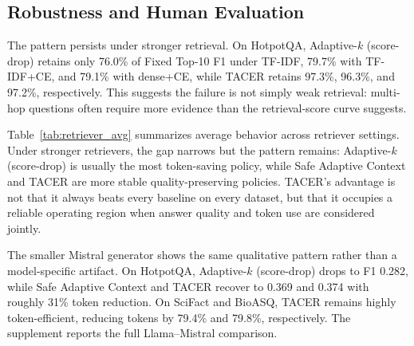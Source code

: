\documentclass[11pt]{article}
\begin{document}
\begin{table}[t]
\centering
\small
\caption{Paired TACER--Adaptive-$k$ (score-drop) confidence check in the main Llama-70B TF-IDF setting. Token deltas are TACER minus Adaptive-$k$ (score-drop), so negative values mean TACER uses fewer tokens.}
\label{tab:paired_confidence}
\end{table}

\subsection{Robustness and Human Evaluation}

The pattern persists under stronger retrieval. On HotpotQA, Adaptive-$k$ (score-drop) retains only 76.0\% of Fixed Top-10 F1 under TF-IDF, 79.7\% with TF-IDF+CE, and 79.1\% with dense+CE, while TACER retains 97.3\%, 96.3\%, and 97.2\%, respectively. This suggests the failure is not simply weak retrieval: multi-hop questions often require more evidence than the retrieval-score curve suggests.

Table~\ref{tab:retriever_avg} summarizes average behavior across retriever settings. Under stronger retrievers, the gap narrows but the pattern remains: Adaptive-$k$ (score-drop) is usually the most token-saving policy, while Safe Adaptive Context and TACER are more stable quality-preserving policies. TACER's advantage is not that it always beats every baseline on every dataset, but that it occupies a reliable operating region when answer quality and token use are considered jointly.

The smaller Mistral generator shows the same qualitative pattern rather than a model-specific artifact. On HotpotQA, Adaptive-$k$ (score-drop) drops to F1 0.282, while Safe Adaptive Context and TACER recover to 0.369 and 0.374 with roughly 31\% token reduction. On SciFact and BioASQ, TACER remains highly token-efficient, reducing tokens by 79.4\% and 79.8\%, respectively. The supplement reports the full Llama--Mistral comparison.
\end{document}
